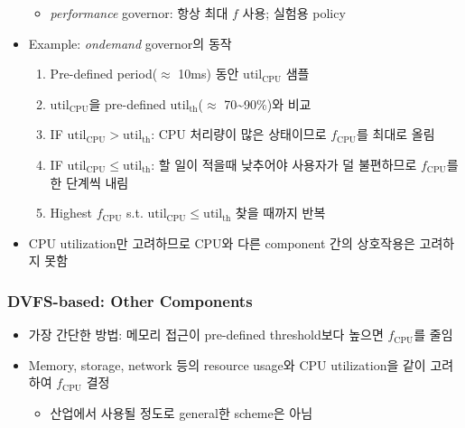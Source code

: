 \begin{itemize}
\begin{itemize}
        \item \textit{performance} governor: 항상 최대 $f$ 사용; 실험용 policy
    \end{itemize}
    \item Example: \textit{ondemand} governor의 동작
    \begin{enumerate}
        \item Pre-defined period($\approx$ 10ms) 동안 $\mathrm{util_{CPU}}$ 샘플
        \item $\mathrm{util_{CPU}}$을 pre-defined $\mathrm{util_{th}}$($\approx$ 70\textasciitilde{}90\%)와 비교
        \item IF $\mathrm{util_{CPU}}>\mathrm{util_{th}}$: CPU 처리량이 많은 상태이므로 $f_{\mathrm{CPU}}$를 최대로 올림
        \item IF $\mathrm{util_{CPU}}\leq\mathrm{util_{th}}$: 할 일이 적을때 낮추어야 사용자가 덜 불편하므로 $f_{\mathrm{CPU}}$를 한 단계씩 내림
        \item Highest $f_{\mathrm{CPU}}$ s.t. $\mathrm{util_{CPU}}\leq\mathrm{util_{th}}$ 찾을 때까지 반복
    \end{enumerate}
    \item CPU utilization만 고려하므로 CPU와 다른 component 간의 상호작용은 고려하지 못함
\end{itemize}

\subsubsection*{DVFS-based: Other Components}
\begin{itemize}
    \item 가장 간단한 방법: 메모리 접근이 pre-defined threshold보다 높으면 $f_{\mathrm{CPU}}$를 줄임
    \item Memory, storage, network 등의 resource usage와 CPU utilization을 같이 고려하여 $f_{\mathrm{CPU}}$ 결정
    \begin{itemize}
        \item 산업에서 사용될 정도로 general한 scheme은 아님
    \end{itemize}
\end{itemize}

